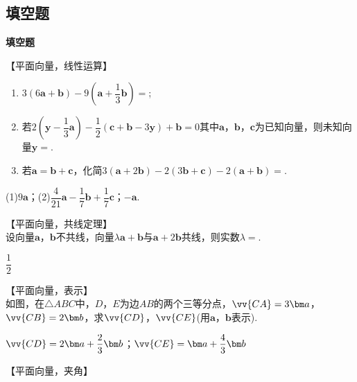   \subsection{填空题}
  \begin{exercise}{\bf 填空题}
    \item 【平面向量，线性运算】
      \begin{enumerate}[label=\arabic*)]
        \item $3(6\bm{a}+\bm{b})-9(\bm{a}+\dfrac13\bm{b})=$\tk;
        \item 若$2(\bm{y}-\dfrac13\bm{a})-\dfrac12(\bm c+\bm b-3\bm y)+\bm b=0$其中$\bm a$，$\bm b$，$\bm c$为已知向量，则未知向量$\bm y=$\tk.
        \item 若$\bm a=\bm b+\bm c$，化简$3(\bm a+2\bm b)-2(3\bm b+\bm c)-2(\bm a+\bm b)=$\tk.
      \end{enumerate}
      \begin{answer}
        (1)$9\bm a$；(2)$\dfrac4{21}\bm a-\dfrac17\bm b+\dfrac17\bm c$；$-\bm a$.
      \end{answer}
    \item 【平面向量，共线定理】\\
      设向量$\bm a$，$\bm b$不共线，向量$\lambda\bm a+\bm b$与$\bm a+2\bm b$共线，则实数$\lambda=$\tk.
      \begin{answer}
        $\dfrac12$
      \end{answer}
    \item 【平面向量，表示】\\
      如图，在$\triangle ABC$中，$D$，$E$为边$AB$的两个三等分点，$\vv{CA}=3\bm a$，$\vv{CB}=2\bm b$，求$\vv{CD}$，$\vv{CE}$(用$\bm a$，$\bm b$表示).
      \begin{flushright}
      \end{flushright}
      \begin{answer}
        $\vv{CD}=2\bm a+\dfrac23\bm b$；$\vv{CE}=\bm a+\dfrac43\bm b$
      \end{answer}
    \item 【平面向量，夹角】\\

\end{exercise}
